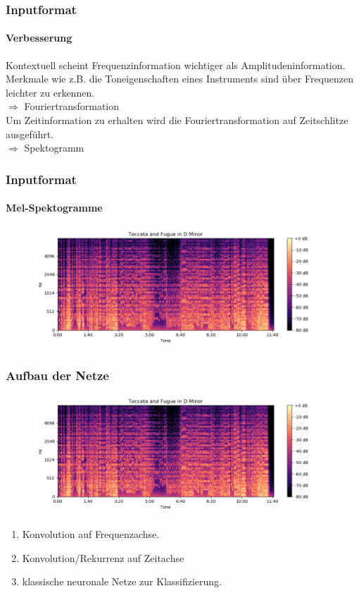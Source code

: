 \documentclass{beamer}
\begin{document}
\frame
{
	\frametitle{Inputformat}
	\framesubtitle{Verbesserung}
	Kontextuell scheint Frequenzinformation wichtiger als Amplitudeninformation.\\
	Merkmale wie z.B. die Toneigenschaften eines Instruments sind über Frequenzen leichter zu erkennen.\\
	$\Rightarrow$ Fouriertransformation\\
	Um Zeitinformation zu erhalten wird die Fouriertransformation auf Zeitschlitze ausgeführt.\\
	$\Rightarrow$ Spektogramm
}

\frame
{
	\frametitle{Inputformat}
	\framesubtitle{Mel-Spektogramme}
	\begin{figure}[h!]
		\centering
		\includegraphics[width=\linewidth,height=\textheight, keepaspectratio]{res/old/tocattaandfuguemelspectogram.png}
	\end{figure}
}

\frame
{
	\frametitle{Aufbau der Netze}
	\begin{figure}[h!]
		\centering
		\includegraphics[width=0.7\linewidth,height=0.7\textheight, keepaspectratio]{res/old/tocattaandfuguemelspectogram.png}
	\end{figure}
	\begin{enumerate}
	\item Konvolution auf Frequenzachse.
	\item Konvolution/Rekurrenz auf Zeitachse
	\item klassische neuronale Netze zur Klassifizierung.
	\end{enumerate}
	
}
\end{document}
